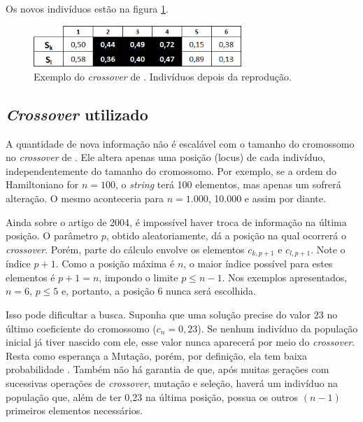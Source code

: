 	Os novos indivíduos estão na figura \ref{fig:cross2011_tabelaDepois}.
		
	\begin{figure}[htbp]
	\centering
		\includegraphics[width=0.70\textwidth]{figs/materiais_metodo/autovalores_com_ga/cross2011_tabelaDepois.png}
	\caption{Exemplo do \emph{crossover} de \cite{metodo2011}. Indivíduos depois da reprodução.}
	\label{fig:cross2011_tabelaDepois}
\end{figure}
	
	
\subsection{\emph{Crossover} utilizado}
\label{sec:crossover_utilizado}

	A quantidade de nova informação não é escalável com o tamanho do cromossomo no \emph{crossover} de \cite{metodo2004}. Ele altera apenas uma posição (locus) de cada indivíduo, independentemente do tamanho do cromossomo. Por exemplo, se a ordem do Hamiltoniano for $n = 100$, o \emph{string} terá 100 elementos, mas apenas um sofrerá alteração. O mesmo aconteceria para $n = 1.000$, 10.000 e assim por diante.
	
	Ainda sobre o artigo de 2004, é impossível haver troca de informação na última posição. O parâmetro $p$, obtido aleatoriamente, dá a posição na qual ocorrerá o \emph{crossover}. Porém, parte do cálculo envolve os elementos $c_{k,p+1}$ e $c_{l,p+1}$. Note o índice $p+1$. Como a posição máxima é $n$, o maior índice possível para estes elementos é $p + 1 = n$, impondo o limite $p \leq n - 1$. Nos exemplos apresentados, $n = 6$, $p \leq 5$ e, portanto, a posição $6$ nunca será escolhida.
	
	Isso pode dificultar a busca. Suponha que uma solução precise do valor 23 no último coeficiente do cromossomo ($c_n = 0,23$). Se nenhum indivíduo da população inicial já tiver nascido com ele, esse valor nunca aparecerá por meio do \emph{crossover}. Resta como esperança a Mutação, porém, por definição, ela tem baixa probabilidade \cite{Linden2008}. Também não há garantia de que, após muitas gerações com sucessivas operações de \emph{crossover}, mutação e seleção, haverá um indivíduo na população que, além de ter 0,23 na última posição, possua os outros $(n-1)$ primeiros elementos necessários.
		
